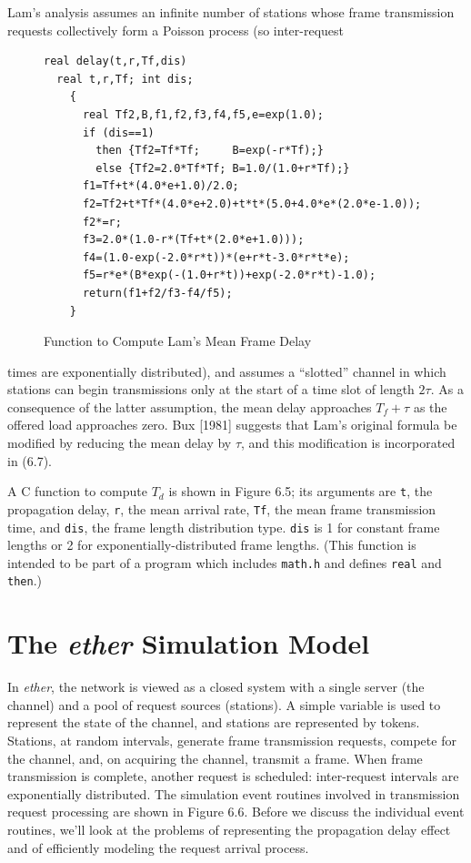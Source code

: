 Lam's analysis assumes an infinite number of stations whose frame transmission requests collectively form a Poisson process (so inter-request
\begin{figure}[H]
\begin{verbatim}
real delay(t,r,Tf,dis)
  real t,r,Tf; int dis;
    {
      real Tf2,B,f1,f2,f3,f4,f5,e=exp(1.0);
      if (dis==1)
        then {Tf2=Tf*Tf;     B=exp(-r*Tf);}
        else {Tf2=2.0*Tf*Tf; B=1.0/(1.0+r*Tf);}
      f1=Tf+t*(4.0*e+1.0)/2.0;
      f2=Tf2+t*Tf*(4.0*e+2.0)+t*t*(5.0+4.0*e*(2.0*e-1.0));
      f2*=r;
      f3=2.0*(1.0-r*(Tf+t*(2.0*e+1.0)));
      f4=(1.0-exp(-2.0*r*t))*(e+r*t-3.0*r*t*e);
      f5=r*e*(B*exp(-(1.0+r*t))+exp(-2.0*r*t)-1.0);
      return(f1+f2/f3-f4/f5);
    }
\end{verbatim}
\caption{Function to Compute Lam's Mean Frame Delay}
\end{figure}
\noindent times are exponentially distributed), and assumes a ``slotted'' channel in which stations can begin transmissions only at the start of a time slot of length $2\tau$. As a consequence of the latter assumption, the mean delay approaches $T_f+\tau$ as the offered load approaches zero. Bux [1981] suggests that Lam's original formula be modified by reducing the mean delay by $\tau$, and this modification is incorporated in (6.7).

A C function to compute $T_d$ is shown in Figure 6.5; its arguments are \texttt{t}, the propagation delay, \texttt{r}, the mean arrival rate, \texttt{Tf}, the mean frame transmission time, and \texttt{dis}, the frame length distribution type. \texttt{dis} is 1 for constant frame lengths or 2 for exponentially-distributed frame lengths. (This function is intended to be part of a program which includes \texttt{math.h} and defines \texttt{real} and \texttt{then}.)

\section{The \emph{ether} Simulation Model}

In \emph{ether}, the network is viewed as a closed system with a single server (the channel) and a pool of request sources (stations). A simple variable is used to represent the state of the channel, and stations are represented by tokens. Stations, at random intervals, generate frame transmission requests, compete for the channel, and, on acquiring the channel, transmit a frame. When frame transmission is complete, another request is scheduled: inter-request intervals are exponentially distributed. The simulation event
\noindent routines involved in transmission request processing are shown in Figure 6.6. Before we discuss the individual event routines, we'll look at the problems of representing the propagation delay effect and of efficiently modeling the request arrival process.

